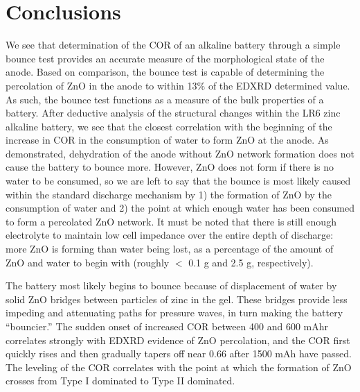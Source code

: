 \section{Conclusions}
\label{sec:dbb:conclusion}

We see that determination of the COR of an alkaline battery through a simple bounce test provides an accurate measure of the morphological state of the anode. Based on comparison, the bounce test is capable of determining the percolation of ZnO in the anode to within 13\% of the EDXRD determined value. As such, the bounce test functions as a measure of the bulk properties of a battery. After deductive analysis of the structural changes within the LR6 zinc alkaline battery, we see that the closest correlation with the beginning of the increase in COR in the consumption of water to form ZnO at the anode.  As demonstrated, dehydration of the anode without ZnO network formation does not cause the battery to bounce more.  However, ZnO does not form if there is no water to be consumed, so we are left to say that the bounce is most likely caused within the standard discharge mechanism by 1) the formation of ZnO by the consumption of water and 2) the point at which enough water has been consumed to form a percolated ZnO network.  It must be noted that there is still enough electrolyte to maintain low cell impedance over the entire depth of discharge: more ZnO is forming than water being lost, as a percentage of the amount of ZnO and water to begin with (roughly $<$ 0.1 g and  2.5 g, respectively).

The battery most likely begins to bounce because of displacement of water by solid ZnO bridges between particles of zinc in the gel.  These bridges provide less impeding and attenuating paths for pressure waves, in turn making the battery “bouncier.”  The sudden onset of increased COR between 400 and 600 mAhr correlates strongly with EDXRD evidence of ZnO percolation, and the COR first quickly rises and then gradually tapers off near 0.66 after 1500 mAh have passed.  The leveling of the COR correlates with the point at which the formation of ZnO crosses from Type I dominated to Type II dominated.


